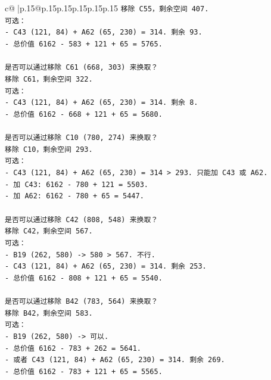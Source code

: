 \documentclass{article}
\begin{document}
{\begin{supertabular}{c@{$\;$}|p{.15\linewidth}@{}p{.15\linewidth}p{.15\linewidth}p{.15\linewidth}p{.15\linewidth}p{.15\linewidth}}
{{{\texttt{移除 C55，剩余空间 407.} \\
\texttt{可选：} \\
\texttt{{-} C43 (121, 84) + A62 (65, 230) = 314. 剩余 93.} \\
\texttt{{-} 总价值 6162 {-} 583 + 121 + 65 = 5765.} \\
\\ 
\texttt{是否可以通过移除 C61 (668, 303) 来换取？} \\
\texttt{移除 C61，剩余空间 322.} \\
\texttt{可选：} \\
\texttt{{-} C43 (121, 84) + A62 (65, 230) = 314. 剩余 8.} \\
\texttt{{-} 总价值 6162 {-} 668 + 121 + 65 = 5680.} \\
\\ 
\texttt{是否可以通过移除 C10 (780, 274) 来换取？} \\
\texttt{移除 C10，剩余空间 293.} \\
\texttt{可选：} \\
\texttt{{-} C43 (121, 84) + A62 (65, 230) = 314 > 293. 只能加 C43 或 A62.} \\
\texttt{{-} 加 C43: 6162 {-} 780 + 121 = 5503.} \\
\texttt{{-} 加 A62: 6162 {-} 780 + 65 = 5447.} \\
\\ 
\texttt{是否可以通过移除 C42 (808, 548) 来换取？} \\
\texttt{移除 C42，剩余空间 567.} \\
\texttt{可选：} \\
\texttt{{-} B19 (262, 580) {-}> 580 > 567. 不行.} \\
\texttt{{-} C43 (121, 84) + A62 (65, 230) = 314. 剩余 253.} \\
\texttt{{-} 总价值 6162 {-} 808 + 121 + 65 = 5540.} \\
\\ 
\texttt{是否可以通过移除 B42 (783, 564) 来换取？} \\
\texttt{移除 B42，剩余空间 583.} \\
\texttt{可选：} \\
\texttt{{-} B19 (262, 580) {-}> 可以.} \\
\texttt{{-} 总价值 6162 {-} 783 + 262 = 5641.} \\
\texttt{{-} 或者 C43 (121, 84) + A62 (65, 230) = 314. 剩余 269.} \\
\texttt{{-} 总价值 6162 {-} 783 + 121 + 65 = 5565.} \\
\\ 
}}}
\end{supertabular}}
\end{document}
